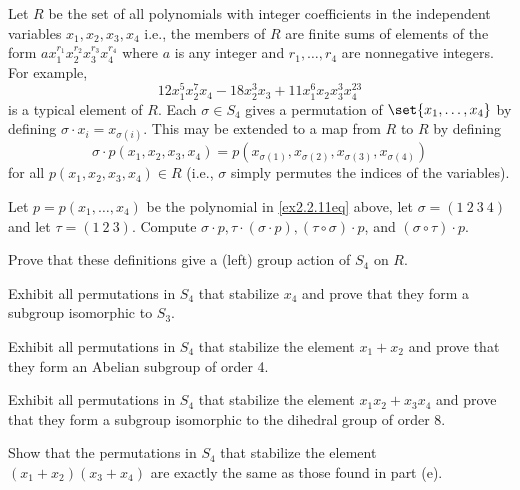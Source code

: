 \begin{exercise} \label{ex2.2.12}
    Let $R$ be the set of all polynomials with integer coefficients in the independent variables $x_1, x_2, x_3, x_4$ i.e., the members of $R$ are finite sums of elements of the form $ax_1^{r_1}x_2^{r_2}x_3^{r_3}x_4^{r_4}$ where $a$ is any integer and $r_1, \ldots, r_4$ are nonnegative integers. For example,
    \begin{equation}
        \label{ex2.2.11eq}
        \tag{$*$}
        12x_1^5x_2^7x_4 - 18x_2^3x_3 + 11x_1^6x_2x_3^3x_4^{23}
    \end{equation}
    is a typical element of $R$. Each $\sigma \in S_4$ gives a permutation of $\set{x_1, \ldots, x_4}$ by defining $\sigma \cdot x_i = x_{\sigma(i)}$. This may be extended to a map from $R$ to $R$ by defining
    \[\sigma \cdot p(x_1, x_2, x_3, x_4) = p(x_{\sigma(1)}, x_{\sigma(2)}, x_{\sigma(3)}, x_{\sigma(4)})\]
    for all $p(x_1, x_2, x_3, x_4) \in R$ (i.e., $\sigma$ simply permutes the indices of the variables).
    \begin{subproblems}
        \item Let $p = p(x_1, \ldots, x_4)$ be the polynomial in \eqref{ex2.2.11eq} above, let $\sigma = (1\ 2\ 3\ 4)$ and let $\tau = (1\ 2\ 3)$. Compute $\sigma \cdot p, \tau \cdot (\sigma \cdot p), (\tau \circ \sigma) \cdot p$, and $(\sigma \circ \tau) \cdot p$.
        \item Prove that these definitions give a (left) group action of $S_4$ on $R$.
        \item Exhibit all permutations in $S_4$ that stabilize $x_4$ and prove that they form a subgroup isomorphic to $S_3$.
        \item Exhibit all permutations in $S_4$ that stabilize the element $x_1 + x_2$ and prove that they form an Abelian subgroup of order 4.
        \item Exhibit all permutations in $S_4$ that stabilize the element $x_1x_2 + x_3x_4$ and prove that they form a subgroup isomorphic to the dihedral group of order 8.
        \item Show that the permutations in $S_4$ that stabilize the element $(x_1 + x_2)(x_3 + x_4)$ are exactly the same as those found in part (e).
    \end{subproblems}
\end{exercise}

